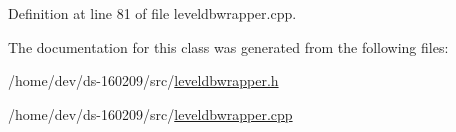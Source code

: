 Definition at line 81 of file leveldbwrapper.\+cpp.



The documentation for this class was generated from the following files\+:\begin{DoxyCompactItemize}
\item 
/home/dev/ds-\/160209/src/\hyperlink{leveldbwrapper_8h}{leveldbwrapper.\+h}\item 
/home/dev/ds-\/160209/src/\hyperlink{leveldbwrapper_8cpp}{leveldbwrapper.\+cpp}\end{DoxyCompactItemize}
